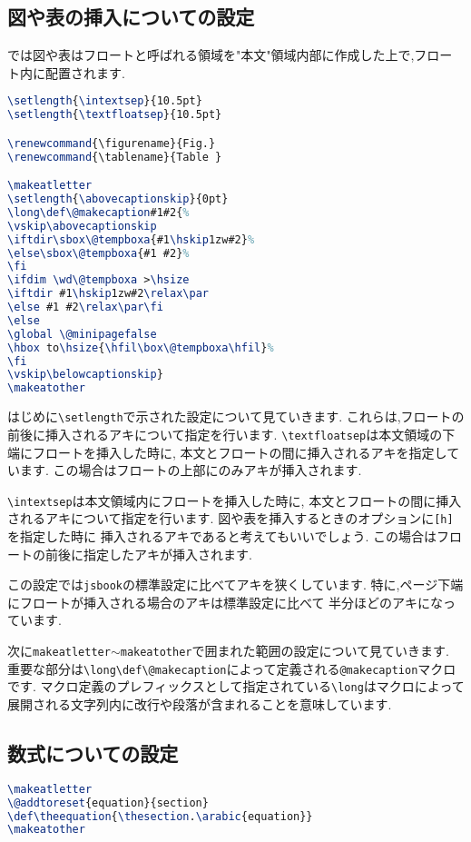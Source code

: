 \subsection{図や表の挿入についての設定}

{\pLaTeX}では図や表はフロートと呼ばれる領域を"本文"領域内部に作成した上で,フロート内に配置されます.
\begin{lstlisting}[caption = フロートまわりの設定, label = list:float, language = tex]
\setlength{\intextsep}{10.5pt}
\setlength{\textfloatsep}{10.5pt}

\renewcommand{\figurename}{Fig.}
\renewcommand{\tablename}{Table }

\makeatletter
\setlength{\abovecaptionskip}{0pt}
\long\def\@makecaption#1#2{%
\vskip\abovecaptionskip
\iftdir\sbox\@tempboxa{#1\hskip1zw#2}%
\else\sbox\@tempboxa{#1 #2}%
\fi
\ifdim \wd\@tempboxa >\hsize
\iftdir #1\hskip1zw#2\relax\par
\else #1 #2\relax\par\fi
\else
\global \@minipagefalse
\hbox to\hsize{\hfil\box\@tempboxa\hfil}%
\fi
\vskip\belowcaptionskip}
\makeatother
\end{lstlisting}

はじめに\verb|\setlength|で示された設定について見ていきます.
これらは,フロートの前後に挿入されるアキについて指定を行います.
\verb|\textfloatsep|は本文領域の下端にフロートを挿入した時に,
本文とフロートの間に挿入されるアキを指定しています.
この場合はフロートの上部にのみアキが挿入されます.

\verb|\intextsep|は本文領域内にフロートを挿入した時に,
本文とフロートの間に挿入されるアキについて指定を行います.
図や表を挿入するときのオプションに\texttt{[h]}を指定した時に
挿入されるアキであると考えてもいいでしょう.
この場合はフロートの前後に指定したアキが挿入されます.

この設定では\texttt{jsbook}の標準設定に比べてアキを狭くしています.
特に,ページ下端にフロートが挿入される場合のアキは標準設定に比べて
半分ほどのアキになっています.

次に\verb|makeatletter|$\sim$\verb|makeatother|で囲まれた範囲の設定について見ていきます.
重要な部分は\verb|\long\def\@makecaption|によって定義される\verb|@makecaption|マクロです.
マクロ定義のプレフィックスとして指定されている\verb|\long|はマクロによって展開される文字列内に改行や段落が含まれることを意味しています.

\subsection{数式についての設定}
\begin{lstlisting}[caption = 数式まわりの設定, label = list:eq, language = tex]
\makeatletter
\@addtoreset{equation}{section}
\def\theequation{\thesection.\arabic{equation}}
\makeatother
\end{lstlisting}
